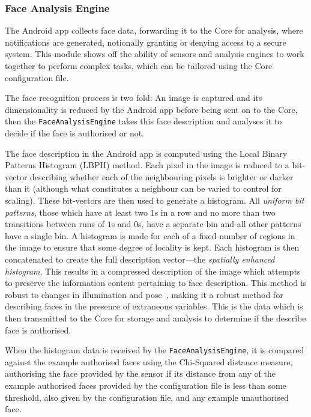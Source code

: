 \documentclass[10pt,a4paper]{article}
\begin{document}

\subsubsection{Face Analysis Engine}
\label{sec:fae}
The Android app collects face data, forwarding it to the Core for analysis, where notifications are generated, notionally granting or denying access to a secure system. This module shows off the ability of sensors and analysis engines to work together to perform complex tasks, which can be tailored using the Core configuration file.

The face recognition process is two fold: An image is captured and its dimensionality is reduced by the Android app before being sent on to the Core, then the \texttt{FaceAnalysisEngine} takes this face description and analyses it to decide if the face is authorised or not.

The face description in the Android app is computed using the Local Binary Patterns Histogram (LBPH) \cite{ahonen2006face} method. Each pixel in the image is reduced to a bit-vector describing whether each of the neighbouring pixels is brighter or darker than it (although what constitutes a neighbour can be varied to control for scaling). These bit-vectors are then used to generate a histogram. All \emph{uniform bit patterns}, those which have at least two $1$s in a row and no more than two transitions between runs of $1$s and $0$s, have a separate bin and all other patterns have a single bin. A histogram is made for each of a fixed number of regions in the image to ensure that some degree of locality is kept. Each histogram is then concatenated to create the full description vector---the \emph{spatially enhanced histogram}. This results in a compressed description of the image which attempts to preserve the information content pertaining to face description. This method is robust to changes in illumination and pose~\cite{ahonen2006face}, making it a robust method for describing faces in the presence of extraneous variables. This is the data which is then transmitted to the Core for storage and analysis to determine if the describe face is authorised.

When the histogram data is received by the \texttt{FaceAnalysisEngine}, it is compared against the example authorised faces using the Chi-Squared distance measure, authorising the face provided by the sensor if its distance from any of the example authorised faces provided by the configuration file is less than some threshold, also given by the configuration file, and any example unauthorised face.
\end{document}
